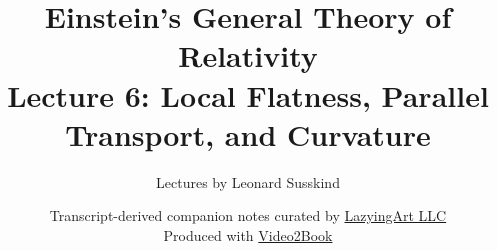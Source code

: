\documentclass[11pt,oneside]{book}
\begin{document}
\frontmatter
\hypersetup{pageanchor=false}
\title{Einstein's General Theory of Relativity\\[0.45em]
\large Lecture 6: Local Flatness, Parallel Transport, and Curvature}
\author{Lectures by Leonard Susskind}
\date{Transcript-derived companion notes curated by
\href{https://lazying.art}{LazyingArt LLC}\\[0.35em]
\small Produced with
\href{https://github.com/lachlanchen/Video2Book}{Video2Book}}
\maketitle
\hypersetup{pageanchor=true}
\clearpage
\mainmatter

\end{document}
